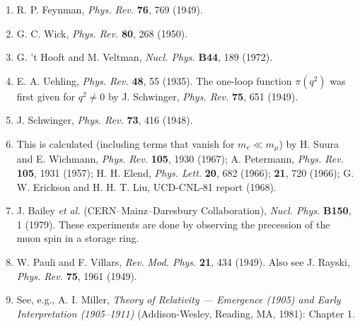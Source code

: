 


\begin{enumerate}
\item\label{ref:11.1} R. P. Feynman, \emph{Phys. Rev.} \textbf{76}, 769 (1949).

\item\label{ref:11.2} G. C. Wick, \emph{Phys. Rev.} \textbf{80}, 268 (1950).

\item\label{ref:11.3} G. 't Hooft and M. Veltman, \emph{Nucl. Phys.} \textbf{B44}, 189
(1972).

\item\label{ref:11.4} E. A. Uehling, \emph{Phys. Rev.} \textbf{48}, 55 (1935). The one-loop
function $\pi(q^2)$ was first given for $q^2 \ne 0$ by J. Schwinger,
\emph{Phys. Rev.} \textbf{75}, 651 (1949).

\item\label{ref:11.5} J. Schwinger, \emph{Phys. Rev.} \textbf{73}, 416 (1948).

\item\label{ref:11.6} This is calculated (including terms that vanish for $m_e \ll m_\mu$)
by H. Suura and E. Wichmann, \emph{Phys. Rev.} \textbf{105}, 1930 (1967);
A. Petermann, \emph{Phys. Rev.} \textbf{105}, 1931 (1957); H. H. Elend,
\emph{Phys. Lett.} \textbf{20}, 682 (1966); \textbf{21}, 720 (1966);
G. W. Erickson and H. H. T. Liu, UCD-CNL-81 report (1968).

\item\label{ref:11.7} J. Bailey \emph{et al.} (CERN--Mainz--Daresbury Collaboration),
\emph{Nucl. Phys.} \textbf{B150}, 1 (1979). These experiments are done by
observing the precession of the muon spin in a storage ring.

\item\label{ref:11.8} W. Pauli and F. Villars, \emph{Rev. Mod. Phys.} \textbf{21}, 434
(1949). Also see J. Rayski, \emph{Phys. Rev.} \textbf{75}, 1961 (1949).

\item\label{ref:11.9} See, e.g., A. I. Miller, \emph{Theory of Relativity --- Emergence
(1905) and Early Interpretation (1905--1911)} (Addison-Wesley, Reading, MA,
1981): Chapter 1.
\end{enumerate}
